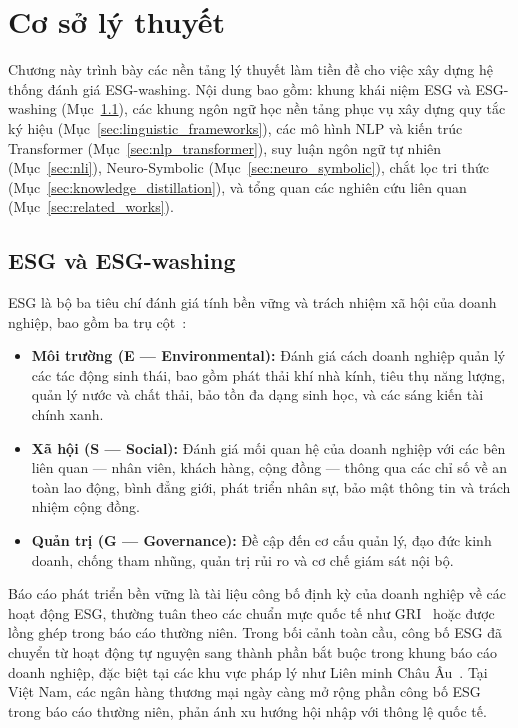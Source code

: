 \chapter{Cơ sở lý thuyết}
\label{ch:theory}

Chương này trình bày các nền tảng lý thuyết làm tiền đề cho việc xây dựng hệ thống đánh giá ESG-washing. Nội dung bao gồm: khung khái niệm ESG và ESG-washing (Mục~\ref{sec:esg_framework}), các khung ngôn ngữ học nền tảng phục vụ xây dựng quy tắc ký hiệu (Mục~\ref{sec:linguistic_frameworks}), các mô hình NLP và kiến trúc Transformer (Mục~\ref{sec:nlp_transformer}), suy luận ngôn ngữ tự nhiên (Mục~\ref{sec:nli}), Neuro-Symbolic (Mục~\ref{sec:neuro_symbolic}), chắt lọc tri thức (Mục~\ref{sec:knowledge_distillation}), và tổng quan các nghiên cứu liên quan (Mục~\ref{sec:related_works}).

\section{ESG và ESG-washing}
\label{sec:esg_framework}

ESG là bộ ba tiêu chí đánh giá tính bền vững và trách nhiệm xã hội của doanh nghiệp, bao gồm ba trụ cột~\cite{buchetti2025literature}:

\begin{itemize}
    \item \textbf{Môi trường (E --- Environmental):} Đánh giá cách doanh nghiệp quản lý các tác động sinh thái, bao gồm phát thải khí nhà kính, tiêu thụ năng lượng, quản lý nước và chất thải, bảo tồn đa dạng sinh học, và các sáng kiến tài chính xanh.
    \item \textbf{Xã hội (S --- Social):} Đánh giá mối quan hệ của doanh nghiệp với các bên liên quan --- nhân viên, khách hàng, cộng đồng --- thông qua các chỉ số về an toàn lao động, bình đẳng giới, phát triển nhân sự, bảo mật thông tin và trách nhiệm cộng đồng.
    \item \textbf{Quản trị (G --- Governance):} Đề cập đến cơ cấu quản lý, đạo đức kinh doanh, chống tham nhũng, quản trị rủi ro và cơ chế giám sát nội bộ.
\end{itemize}

Báo cáo phát triển bền vững là tài liệu công bố định kỳ của doanh nghiệp về các hoạt động ESG, thường tuân theo các chuẩn mực quốc tế như GRI~\cite{gri2021gri} hoặc được lồng ghép trong báo cáo thường niên. Trong bối cảnh toàn cầu, công bố ESG đã chuyển từ hoạt động tự nguyện sang thành phần bắt buộc trong khung báo cáo doanh nghiệp, đặc biệt tại các khu vực pháp lý như Liên minh Châu Âu~\cite{lagasio2024esg}. Tại Việt Nam, các ngân hàng thương mại ngày càng mở rộng phần công bố ESG trong báo cáo thường niên, phản ánh xu hướng hội nhập với thông lệ quốc tế.

